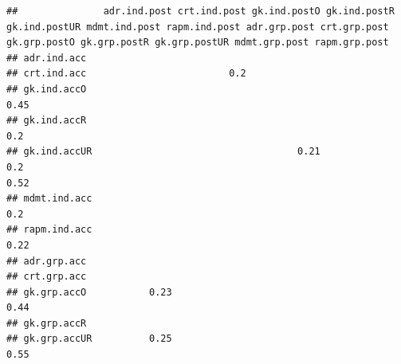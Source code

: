 \documentclass[]{article}
\begin{document}
\begin{verbatim}
##               adr.ind.post crt.ind.post gk.ind.postO gk.ind.postR gk.ind.postUR mdmt.ind.post rapm.ind.post adr.grp.post crt.grp.post gk.grp.postO gk.grp.postR gk.grp.postUR mdmt.grp.post rapm.grp.post
## adr.ind.acc                                                                                                                                                                                              
## crt.ind.acc                         0.2                                                                                                                                                                  
## gk.ind.accO                                                                                                                                                                            0.45              
## gk.ind.accR                                                                                                                                                                             0.2              
## gk.ind.accUR                                    0.21                        0.2                                                                                                        0.52              
## mdmt.ind.acc                                                                                            0.2                                                                                              
## rapm.ind.acc                                                                                                                                                             0.22                            
## adr.grp.acc                                                                                                                                                                                              
## crt.grp.acc                                                                                                                                                                                              
## gk.grp.accO           0.23                                                                                                                                                             0.44              
## gk.grp.accR                                                                                                                                                                                              
## gk.grp.accUR          0.25                                                                                                                                                             0.55              

\end{verbatim}
\end{document}
